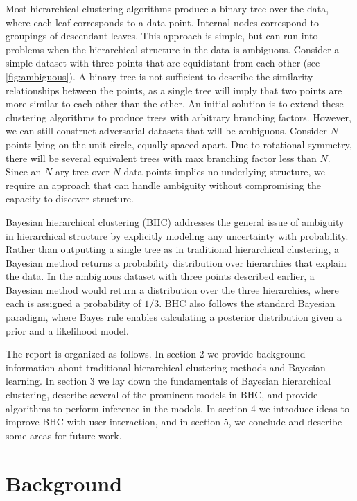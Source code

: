 \documentclass{article}
\begin{document}
Most hierarchical clustering algorithms
produce a binary tree over the data,
where each leaf corresponds to a data point.
Internal nodes correspond to groupings of descendant leaves.
This approach is simple, but can run into
problems when the hierarchical structure
in the data is ambiguous. Consider
a simple dataset with three points
that are equidistant from each other (see \autoref{fig:ambiguous}).
A binary tree is not sufficient
to describe the similarity relationships
between the points, as a single tree
will imply that two points are more similar
to each other than the other.
An initial solution is to extend these clustering
algorithms to produce trees with arbitrary
branching factors.
However, we can still construct 
adversarial datasets 
that will be ambiguous.
Consider $N$ points lying on the unit circle, equally spaced apart.
Due to rotational symmetry, there will be several
equivalent trees with max branching factor less than $N$.
Since an $N$-ary tree over $N$ data points
implies no underlying structure,
we require an approach that can
handle ambiguity without compromising
the capacity to discover structure.

Bayesian hierarchical clustering (BHC)
addresses the general issue of
ambiguity in hierarchical structure
by explicitly modeling any uncertainty with probability.
Rather than outputting a single tree
as in traditional hierarchical clustering,
a Bayesian method
returns a probability distribution
over hierarchies that explain the data.
In the ambiguous dataset with three points described earlier,
a Bayesian method would return
a distribution over the three hierarchies,
where each is assigned
a probability of $1/3$.
BHC
also follows the standard Bayesian paradigm,
where Bayes rule enables
calculating a posterior distribution
given a prior and a likelihood model.

The report is organized as follows.
In section 2 we provide background information
about traditional hierarchical clustering
methods and Bayesian learning.
In section 3 we lay down the fundamentals
of Bayesian hierarchical clustering,
describe several of the prominent
models in BHC, and provide
algorithms to perform inference in the models.
In section 4 we introduce ideas
to improve BHC with user interaction,
and in section 5, we conclude and describe
some areas for future work.

\section{Background}
\end{document}
